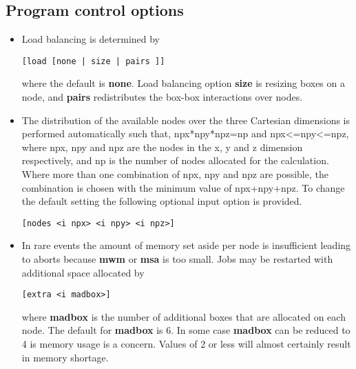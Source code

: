 \subsection{Program control options}
\begin{itemize}
\item
Load balancing is determined by
\begin{verbatim}
[load [none | size | pairs ]]
\end{verbatim}
where the default is {\bf none}. Load balancing option {\bf size}
is resizing boxes on a node, and {\bf pairs} redistributes the
box-box interactions over nodes.
\item
The distribution of the available nodes over the three Cartesian
dimensions is performed automatically such that, npx*npy*npz=np
and npx<=npy<=npz, where npx, npy and npz are the nodes in the
x, y and z dimension respectively, and np is the number of nodes
allocated for the calculation. Where more than one combination
of npx, npy and npz are possible, the combination is chosen with
the minimum value of npx+npy+npz. To change the default setting
the following optional input option is provided.
\begin{verbatim}
[nodes <i npx> <i npy> <i npz>]
\end{verbatim}
\item
In rare events the amount of memory set aside per node is insufficient
leading to aborts because {\bf mwm} or {\bf msa} is too small. Jobs
may be restarted with additional space allocated by
\begin{verbatim}
[extra <i madbox>]
\end{verbatim}
where {\bf madbox} is the number of additional boxes that are allocated
on each node. The default for {\bf madbox} is 6. In some case {\bf madbox}
can be reduced to 4 is memory usage is a concern. Values of 2 or less
will almost certainly result in memory shortage.
\end{itemize}
